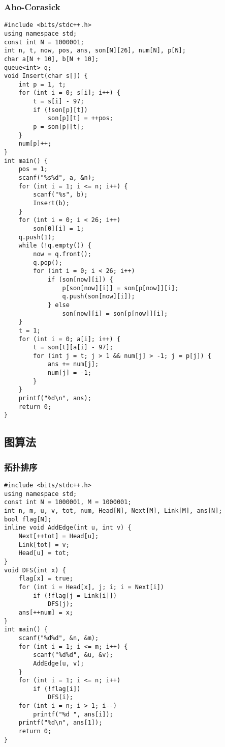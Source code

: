 ﻿\documentclass[a4paper]{article}
\begin{document}
\subsubsection{Aho-Corasick}
\begin{lstlisting}
#include <bits/stdc++.h>
using namespace std;
const int N = 1000001;
int n, t, now, pos, ans, son[N][26], num[N], p[N];
char a[N + 10], b[N + 10];
queue<int> q;
void Insert(char s[]) {
    int p = 1, t;
    for (int i = 0; s[i]; i++) {
        t = s[i] - 97;
        if (!son[p][t])
            son[p][t] = ++pos;
        p = son[p][t];
    }
    num[p]++;
}
int main() {
    pos = 1;
    scanf("%s%d", a, &n);
    for (int i = 1; i <= n; i++) {
        scanf("%s", b);
        Insert(b);
    }
    for (int i = 0; i < 26; i++)
        son[0][i] = 1;
    q.push(1);
    while (!q.empty()) {
        now = q.front();
        q.pop();
        for (int i = 0; i < 26; i++)
            if (son[now][i]) {
                p[son[now][i]] = son[p[now]][i];
                q.push(son[now][i]);
            } else
                son[now][i] = son[p[now]][i];
    }
    t = 1;
    for (int i = 0; a[i]; i++) {
        t = son[t][a[i] - 97];
        for (int j = t; j > 1 && num[j] > -1; j = p[j]) {
            ans += num[j];
            num[j] = -1;
        }
    }
    printf("%d\n", ans);
    return 0;
}
\end{lstlisting}
\subsection{图算法}
\subsubsection{拓扑排序}
\begin{lstlisting}
#include <bits/stdc++.h>
using namespace std;
const int N = 1000001, M = 1000001;
int n, m, u, v, tot, num, Head[N], Next[M], Link[M], ans[N];
bool flag[N];
inline void AddEdge(int u, int v) {
    Next[++tot] = Head[u];
    Link[tot] = v;
    Head[u] = tot;
}
void DFS(int x) {
    flag[x] = true;
    for (int i = Head[x], j; i; i = Next[i])
        if (!flag[j = Link[i]])
            DFS(j);
    ans[++num] = x;
}
int main() {
    scanf("%d%d", &n, &m);
    for (int i = 1; i <= m; i++) {
        scanf("%d%d", &u, &v);
        AddEdge(u, v);
    }
    for (int i = 1; i <= n; i++)
        if (!flag[i])
            DFS(i);
    for (int i = n; i > 1; i--)
        printf("%d ", ans[i]);
    printf("%d\n", ans[1]);
    return 0;
}
\end{lstlisting}
\end{document}
